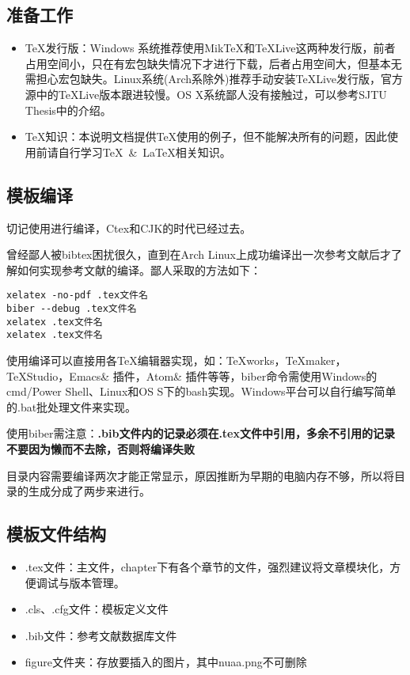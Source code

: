 \subsection{准备工作}
\begin{itemize}
  \item \TeX 发行版：Windows 系统推荐使用MikTeX和TeXLive这两种发行版，前者占用空间小，只在有宏包缺失情况下才进行下载，后者占用空间大，但基本无需担心宏包缺失。Linux系统(Arch系除外)推荐手动安装TeXLive发行版，官方源中的TeXLive版本跟进较慢。OS X系统鄙人没有接触过，可以参考SJTU Thesis中的介绍。
  \item \TeX 知识：本说明文档提供\TeX 使用的例子，但不能解决所有的问题，因此使用前请自行学习\TeX~\&~\LaTeX 相关知识。
\end{itemize}

\subsection{模板编译}

切记使用\XeLaTeX 进行编译，Ctex和CJK的时代已经过去。

曾经鄙人被bibtex困扰很久，直到在Arch Linux上成功编译出一次参考文献后才了解如何实现参考文献的编译。鄙人采取的方法如下：
\begin{lstlisting}[basicstyle=\small\ttfamily, caption=手动逐次编译, numbers=none]
xelatex -no-pdf .tex文件名
biber --debug .tex文件名
xelatex .tex文件名
xelatex .tex文件名
\end{lstlisting}

使用\XeLaTeX 编译可以直接用各\TeX 编辑器实现，如：TeXworks，TeXmaker，TeXStudio，Emacs\& 插件，Atom\& 插件等等，biber命令需使用Windows的cmd/Power Shell、Linux和OS S下的bash实现。Windows平台可以自行编写简单的.bat批处理文件来实现。

使用biber需注意：\textbf{.bib文件内的记录必须在.tex文件中引用，多余不引用的记录不要因为懒而不去除，否则将编译失败}

目录内容需要编译两次才能正常显示，原因推断为早期的电脑内存不够，所以将目录的生成分成了两步来进行。

\subsection{模板文件结构}
\begin{itemize}[noitemsep,topsep=0pt,parsep=0pt,partopsep=0pt]
  \item .tex文件：主文件，chapter下有各个章节的文件，强烈建议将文章模块化，方便调试与版本管理。
  \item .cls、.cfg文件：模板定义文件
  \item .bib文件：参考文献数据库文件
  \item figure文件夹：存放要插入的图片，其中nuaa.png不可删除
\end{itemize}
